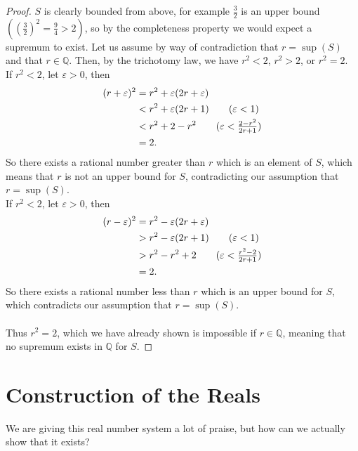 \documentclass[../real_analysis.tex]{subfiles}
\begin{document}
        \begin{proof}
            $S$ is clearly bounded from above, for example $\frac{3}{2}$ is an upper bound $\left(\left(\frac{3}{2}\right)^2 = \frac{9}{4} > 2\right)$, so by the completeness property we would expect a supremum to exist. Let us assume by way of contradiction that $r=\sup(S)$ and that $r\in\mathbb{Q}$.
            Then, by the trichotomy law, we have $r^2<2$, $r^2>2$, or $r^2=2$.\\
            If $r^2<2$, let $\varepsilon>0$, then
            \begin{align}
                (r+\varepsilon)^2 &= r^2+\varepsilon(2r+\varepsilon)\\
                &< r^2+\varepsilon(2r+1)\tag{$\varepsilon<1$}\\
                &< r^2+2-r^2\tag{$\varepsilon<\frac{2-r^2}{2r+1}$}\\
                &= 2.
            \end{align}
            So there exists a rational number greater than $r$ which is an element of $S$, which means that $r$ is not an upper bound for $S$, contradicting our assumption that $r=\sup(S)$.\\
            If $r^2<2$, let $\varepsilon>0$, then
            \begin{align}
                (r-\varepsilon)^2 &= r^2-\varepsilon(2r+\varepsilon)\\
                &> r^2-\varepsilon(2r+1)\tag{$\varepsilon<1$}\\
                &> r^2-r^2+2\tag{$\varepsilon<\frac{r^2-2}{2r+1}$}\\
                &= 2.
            \end{align}
            So there exists a rational number less than $r$ which is an upper bound for $S$, which contradicts our assumption that $r=\sup(S)$.\\\\
            Thus $r^2=2$, which we have already shown is impossible if $r\in\mathbb{Q}$, meaning that no supremum exists in $\mathbb{Q}$ for $S$.
        \end{proof}

    \section{Construction of the Reals}\label{sec:construction-of-the-reals}
        We are giving this real number system a lot of praise, but how can we actually show that it exists?
\end{document}
